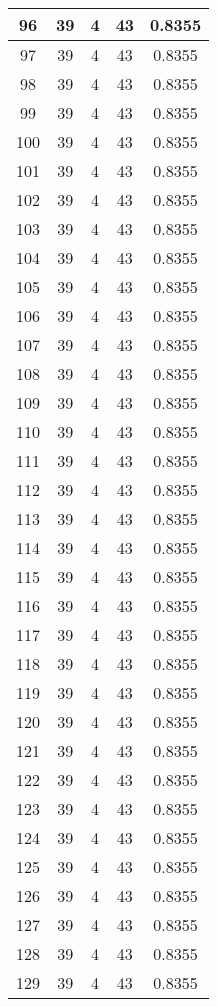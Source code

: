 \documentclass[letterpaper, 12pt]{article}
\begin{document}
\begin{longtable}{|c|c|c|c|c|}
\hline
96 & 39 & 4 & 43 & 0.8355 \\
\hline
97 & 39 & 4 & 43 & 0.8355 \\
\hline
98 & 39 & 4 & 43 & 0.8355 \\
\hline
99 & 39 & 4 & 43 & 0.8355 \\
\hline
100 & 39 & 4 & 43 & 0.8355 \\
\hline
101 & 39 & 4 & 43 & 0.8355 \\
\hline
102 & 39 & 4 & 43 & 0.8355 \\
\hline
103 & 39 & 4 & 43 & 0.8355 \\
\hline
104 & 39 & 4 & 43 & 0.8355 \\
\hline
105 & 39 & 4 & 43 & 0.8355 \\
\hline
106 & 39 & 4 & 43 & 0.8355 \\
\hline
107 & 39 & 4 & 43 & 0.8355 \\
\hline
108 & 39 & 4 & 43 & 0.8355 \\
\hline
109 & 39 & 4 & 43 & 0.8355 \\
\hline
110 & 39 & 4 & 43 & 0.8355 \\
\hline
111 & 39 & 4 & 43 & 0.8355 \\
\hline
112 & 39 & 4 & 43 & 0.8355 \\
\hline
113 & 39 & 4 & 43 & 0.8355 \\
\hline
114 & 39 & 4 & 43 & 0.8355 \\
\hline
115 & 39 & 4 & 43 & 0.8355 \\
\hline
116 & 39 & 4 & 43 & 0.8355 \\
\hline
117 & 39 & 4 & 43 & 0.8355 \\
\hline
118 & 39 & 4 & 43 & 0.8355 \\
\hline
119 & 39 & 4 & 43 & 0.8355 \\
\hline
120 & 39 & 4 & 43 & 0.8355 \\
\hline
121 & 39 & 4 & 43 & 0.8355 \\
\hline
122 & 39 & 4 & 43 & 0.8355 \\
\hline
123 & 39 & 4 & 43 & 0.8355 \\
\hline
124 & 39 & 4 & 43 & 0.8355 \\
\hline
125 & 39 & 4 & 43 & 0.8355 \\
\hline
126 & 39 & 4 & 43 & 0.8355 \\
\hline
127 & 39 & 4 & 43 & 0.8355 \\
\hline
128 & 39 & 4 & 43 & 0.8355 \\
\hline
129 & 39 & 4 & 43 & 0.8355 \\

\end{longtable}
\end{document}
